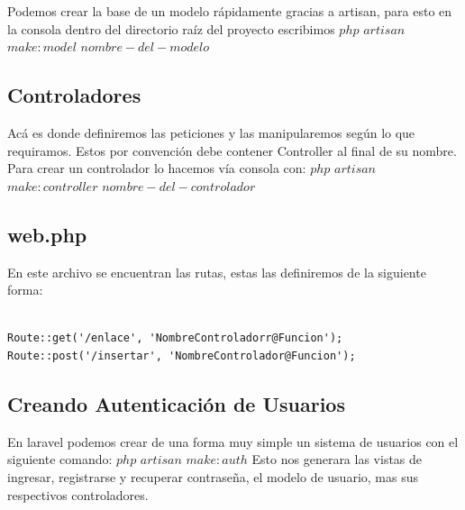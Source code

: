 \documentclass[spanish]{theme/pclreport}
\begin{document}
Podemos crear la base de un modelo rápidamente gracias a artisan, para esto en la consola dentro del directorio raíz del proyecto escribimos $php$ $artisan$ $make:model$ $nombre-del-modelo$

\subsection{Controladores}
Acá es donde definiremos las peticiones y las manipularemos según lo que requiramos. Estos por convención debe contener Controller al final de su nombre. \newline 
Para crear un controlador lo hacemos vía consola con: \newline 
$php$ $artisan$ $make:controller$ $nombre-del-controlador$

\subsection{web.php}
En este archivo se encuentran las rutas, estas las definiremos de la siguiente forma:

\begin{lstlisting}[caption={Ejemplo de rutas},captionpos=b]

Route::get('/enlace', 'NombreControladorr@Funcion');
Route::post('/insertar', 'NombreControlador@Funcion');
\end{lstlisting}

\subsection{Creando Autenticación de Usuarios}
En laravel podemos crear de una forma muy simple un sistema de usuarios con el siguiente comando: \newline
$php$ $artisan$ $make:auth$ \newline
Esto nos generara las vistas de ingresar, registrarse y recuperar contraseña, el modelo de usuario, mas sus respectivos controladores.



\listoffigures
\end{document}
